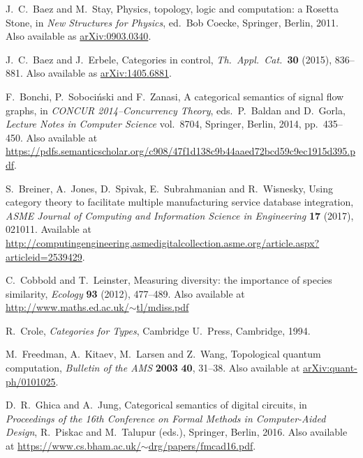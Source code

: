 \documentclass[12pt]{amsart}
\begin{document}
\begin{thebibliography}{10}
  J.\ C.\ Baez and M.\ Stay, Physics, topology, logic and computation: a Rosetta Stone, in \textsl{New Structures for Physics}, ed.\ Bob Coecke, Springer, Berlin, 2011.  Also available as \href{https://arxiv.org/abs/0903.0340}{arXiv:0903.0340}.

 J.\ C.\ Baez and J.\ Erbele, Categories in control,  \textsl{Th.\ Appl.\ Cat.\ }\textbf{30} (2015), 836--881.   Also available as
\href{http://arxiv.org/abs/1405.6881}{arXiv:1405.6881}.

 F.\ Bonchi, P.\ Soboci\'nski and F.\ Zanasi, A categorical semantics of signal flow graphs, in \textsl{CONCUR 2014--Concurrency Theory}, eds.\ P.\ Baldan and D.\ Gorla, \textsl{Lecture Notes in Computer Science} vol.\ 8704, Springer, Berlin, 2014, pp.\ 435--450.  Also available at \href{https://pdfs.semanticscholar.org/c908/47f1d138c9b44aaed72bcd59c9ec1915d395.pdf}{https://pdfs.semanticscholar.org/c908/47f1d138c9b44aaed72bcd59c9ec1915d395.pdf}.

 S.\ Breiner, A.\ Jones, D.\ Spivak, E.\ Subrahmanian and R.\ Wisnesky, Using category theory to facilitate multiple manufacturing service database integration, \textsl{ASME Journal of Computing and Information Science in Engineering} \textbf{17} (2017), 021011.  Available at \href{http://computingengineering.asmedigitalcollection.asme.org/article.aspx?articleid=2539429}{http://computingengineering.asmedigitalcollection.asme.org/article.aspx?}\break \href{http://computingengineering.asmedigitalcollection.asme.org/article.aspx?articleid=2539429}{articleid=2539429}.

 C.\ Cobbold and T.\ Leinster, Measuring diversity: the importance of species similarity, \textsl{Ecology} \textbf{93} (2012), 477--489.  Also available at \href{http://www.maths.ed.ac.uk/~tl/mdiss.pdf}{http://www.maths.ed.ac.uk/$\sim$tl/mdiss.pdf}

 R.\ Crole, \textsl{Categories for Types}, Cambridge U.\ Press, Cambridge, 1994.

 M.\ Freedman, A.\ Kitaev, M.\ Larsen and Z.\ Wang, Topological quantum computation, \textsl{Bulletin of the AMS} \textbf{2003} \textbf{40}, 31–38.  Also available at \href{https://arxiv.org/abs/quant-ph/0101025}{arXiv:quant-ph/0101025}.

  D.\ R.\ Ghica and A.\ Jung, Categorical semantics of digital circuits, in \textsl{Proceedings of the 16th Conference on Formal Methods in Computer-Aided Design}, 
R.\ Piskac and M.\ Talupur (eds.), Springer, Berlin, 2016.  Also available at \href{https://www.cs.bham.ac.uk/~drg/papers/fmcad16.pdf}{https://www.cs.bham.ac.uk/$\sim$drg/papers/fmcad16.pdf}.


\end{thebibliography}
\end{document}
